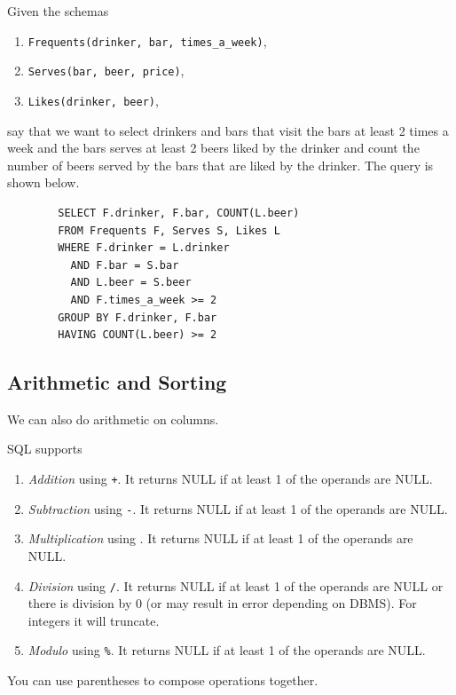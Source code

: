     \begin{example}
      \label{ex:complex-example-with-beers}
      Given the schemas 
      \begin{enumerate}
        \item \texttt{Frequents(drinker, bar, times\_a\_week)}, 
        \item \texttt{Serves(bar, beer, price)}, 
        \item \texttt{Likes(drinker, beer)}, 
      \end{enumerate}
      say that we want to select drinkers and bars that visit the bars at least 2 times a week and the bars serves at least 2 beers liked by the drinker and count the number of beers served by the bars that are liked by the drinker. The query is shown below. 

      \begin{lstlisting}
        SELECT F.drinker, F.bar, COUNT(L.beer) 
        FROM Frequents F, Serves S, Likes L 
        WHERE F.drinker = L.drinker
          AND F.bar = S.bar 
          AND L.beer = S.beer 
          AND F.times_a_week >= 2 
        GROUP BY F.drinker, F.bar 
        HAVING COUNT(L.beer) >= 2 
      \end{lstlisting}
    \end{example}

\subsection{Arithmetic and Sorting} 

  We can also do arithmetic on columns. 

  \begin{definition}
    \label{def:arithmetic-operations}
    SQL supports 
    \begin{enumerate}
      \item \textit{Addition} using \texttt{+}. It returns NULL if at least 1 of the operands are NULL. 
      \item \textit{Subtraction} using \texttt{-}. It returns NULL if at least 1 of the operands are NULL. 
      \item \textit{Multiplication} using \texttt{\*}. It returns NULL if at least 1 of the operands are NULL. 
      \item \textit{Division} using \texttt{/}. It returns NULL if at least 1 of the operands are NULL or there is division by $0$ (or may result in error depending on DBMS). For integers it will truncate. 
      \item \textit{Modulo} using \texttt{\%}. It returns NULL if at least 1 of the operands are NULL. 
    \end{enumerate}
    You can use parentheses to compose operations together. 
  \end{definition}

